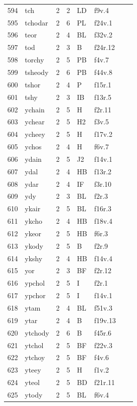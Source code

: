 \documentclass[11pt,a4paper]{article}
\begin{document}
\begin{landscape}
\begin{longtable}{@{}r>{\ttfamily}lrrl>{\ttfamily}l>{\raggedright\arraybackslash}p{80mm}>{\raggedright\arraybackslash}p{36mm}@{}}
594 & tch & 2 & 2 & LD & f9v.4 &  & \\
595 & tchodar & 2 & 6 & PL & f24v.1 &  & \\
596 & teor & 2 & 4 & BL & f32v.2 &  & \\
597 & tod & 2 & 3 & B & f24r.12 &  & \\
598 & torchy & 2 & 5 & PB & f4v.7 &  & \\
599 & tsheody & 2 & 6 & PB & f44v.8 &  & \\
600 & tshor & 2 & 4 & P & f15r.1 &  & \\
601 & tshy & 2 & 3 & IB & f13r.5 &  & \\
602 & ychain & 2 & 5 & H & f2r.11 &  & \\
603 & ychear & 2 & 5 & H2 & f3v.5 &  & \\
604 & ycheey & 2 & 5 & H & f17v.2 &  & \\
605 & ychos & 2 & 4 & H & f6v.7 &  & \\
606 & ydain & 2 & 5 & J2 & f14v.1 &  & \\
607 & ydal & 2 & 4 & HB & f13r.2 &  & \\
608 & ydar & 2 & 4 & IF & f3r.10 &  & \\
609 & ydy & 2 & 3 & BL & f2r.3 &  & \\
610 & ykair & 2 & 5 & BL & f16r.3 &  & \\
611 & ykcho & 2 & 4 & HB & f18v.4 &  & \\
612 & ykeor & 2 & 5 & HB & f6r.3 &  & \\
613 & ykody & 2 & 5 & B & f2r.9 &  & \\
614 & ykshy & 2 & 4 & HB & f14v.4 &  & \\
615 & yor & 2 & 3 & BF & f2r.12 &  & \\
616 & ypchol & 2 & 5 & I & f2r.1 &  & \\
617 & ypchor & 2 & 5 & I & f14v.1 &  & \\
618 & ytam & 2 & 4 & BL & f51v.3 &  & \\
619 & ytar & 2 & 4 & B & f19v.13 &  & \\
620 & ytchody & 2 & 6 & B & f45r.6 &  & \\
621 & ytchol & 2 & 5 & BF & f22v.3 &  & \\
622 & ytchoy & 2 & 5 & BF & f4v.6 &  & \\
623 & yteey & 2 & 5 & H & f1v.2 &  & \\
624 & yteol & 2 & 5 & BD & f21r.11 &  & \\
625 & ytody & 2 & 5 & BL & f6v.4 &  & \\

\end{longtable}
\end{landscape}
\end{document}
